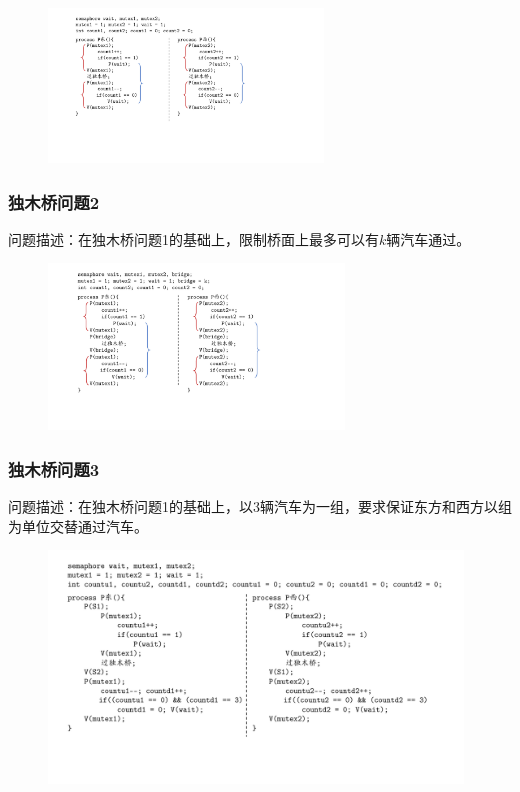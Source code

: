 \documentclass[cs4size,a4paper,10pt]{ctexart}
\begin{document}
	\begin{figure}[H]
		\centering
		\includegraphics[width=0.65\textwidth]{img/独木桥问题1.pdf}
	\end{figure}				

	
	\subsubsection{独木桥问题2}
	问题描述：在独木桥问题1的基础上，限制桥面上最多可以有$k$辆汽车通过。

	\begin{figure}[H]
		\centering
		\includegraphics[width=0.7\textwidth]{img/独木桥问题2.pdf}
	\end{figure}


	\subsubsection{独木桥问题3}
	问题描述：在独木桥问题1的基础上，以3辆汽车为一组，要求保证东方和西方以组为单位交替通过汽车。

	\begin{figure}[H]
		\centering
		\includegraphics[width=0.98\textwidth]{img/独木桥问题3.pdf}
	\end{figure}
\end{document}

